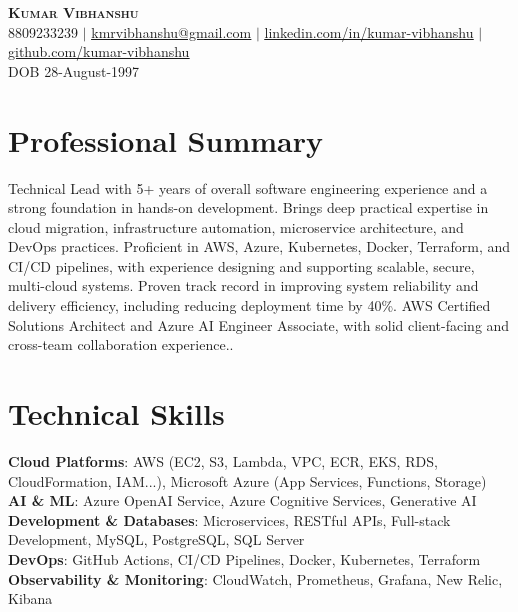 \documentclass[letterpaper,11pt]{article}
\begin{document}
\begin{center}
    \textbf{\Huge \scshape Kumar Vibhanshu} \\ \vspace{1pt}
    \small 8809233239 $|$ \href{mailto:kmrvibhanshu@gmail.com}{\underline{kmrvibhanshu@gmail.com}} $|$ 
    \href{https://linkedin.com/in/kumar-vibhanshu}{\underline{linkedin.com/in/kumar-vibhanshu}} $|$
    \href{https://github.com/kumar-vibhanshu}{\underline{github.com/kumar-vibhanshu}} \\
    \small \vspace{4pt} DOB 28-August-1997
\end{center}

\section{Professional Summary}
\small{Technical Lead with 5+ years of overall software engineering experience and a strong foundation in hands-on development. Brings deep practical expertise in cloud migration, infrastructure automation, microservice architecture, and DevOps practices. Proficient in AWS, Azure, Kubernetes, Docker, Terraform, and CI/CD pipelines, with experience designing and supporting scalable, secure, multi-cloud systems. Proven track record in improving system reliability and delivery efficiency, including reducing deployment time by 40\%. AWS Certified Solutions Architect and Azure AI Engineer Associate, with solid client-facing and cross-team collaboration experience..}


\section{Technical Skills}
 \begin{itemize}[leftmargin=0.15in, label={}]
    \small{\item{
     \textbf{Cloud Platforms}{: AWS  (EC2, S3, Lambda, VPC, ECR, EKS, RDS, CloudFormation, IAM...), Microsoft Azure (App Services, Functions, Storage)} \\
     \textbf{AI \& ML}{: Azure OpenAI Service, Azure Cognitive Services, Generative AI} \\
     \textbf{Development \& Databases}{: Microservices, RESTful APIs, Full-stack Development, MySQL, PostgreSQL, SQL Server} \\
     \textbf{DevOps}{: GitHub Actions, CI/CD Pipelines, Docker, Kubernetes, Terraform} \\
     \textbf{Observability \& Monitoring}{: CloudWatch, Prometheus, Grafana, New Relic, Kibana}
    }}
 \end{itemize}
\end{document}
